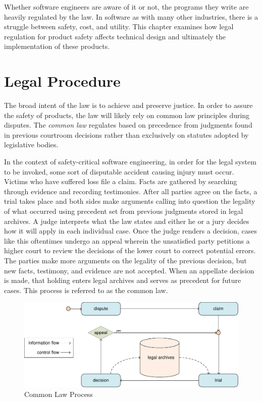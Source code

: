 \documentclass[12pt]{report}
\begin{document}
Whether software engineers are aware of it or not, the programs they write are heavily regulated by the law. In software as with many other industries, there is a struggle between safety, cost, and utility. This chapter examines how legal regulation for product safety affects technical design and ultimately the implementation of these products.

\section{Legal Procedure} 

The broad intent of the law is to achieve and preserve justice. In order to assure the safety of products, the law will likely rely on common law principles during disputes. The \textit{common law} regulates based on precedence from judgments found in previous courtroom decisions rather than exclusively on statutes adopted by legislative bodies. 

In the context of safety-critical software engineering, in order for the legal system to be invoked, some sort of disputable accident causing injury must occur. Victims who have suffered loss file a claim. Facts are gathered by searching through evidence and recording testimonies. After all parties agree on the facts, a trial takes place and both sides make arguments calling into question the legality of what occurred using precedent set from previous judgments stored in legal archives. A judge interprets what the law states and either he or a jury decides how it will apply in each individual case. Once the judge renders a decision, cases like this oftentimes undergo an appeal wherein the unsatisfied party petitions a higher court to review the decisions of the lower court to correct potential errors. The parties make more arguments on the legality of the previous decision, but new facts, testimony, and evidence are not accepted. When an appellate decision is made, that holding enters legal archives and serves as precedent for future cases. This process is referred to as the common law. 

\begin{figure}[t] 
\begin{center} 
\includegraphics[scale=0.73]{figures/commonlaw.pdf} 
\end{center} 
\caption{Common Law Process} 
\label{fig:commonlaw} 
\end{figure} 
\end{document}
